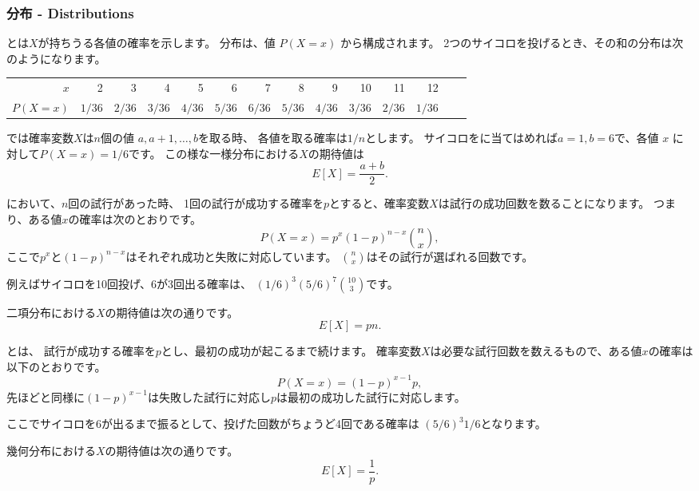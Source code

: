 \subsubsection{分布 - Distributions}


とは$X$が持ちうる各値の確率を示します。
分布は、値 $P(X=x)$ から構成されます。
2つのサイコロを投げるとき、その和の分布は次のようになります。

\begin{center}
\small {
\begin{tabular}{r|rrrrrrrrrrrrr}
$x$ & 2 & 3 & 4 & 5 & 6 & 7 & 8 & 9 & 10 & 11 & 12 \\
$P(X=x)$ & $1/36$ & $2/36$ & $3/36$ & $4/36$ & $5/36$ & $6/36$ & $5/36$ & $4/36$ & $3/36$ & $2/36$ & $1/36$ \\
\end{tabular}
}
\end{center}

では確率変数$X$は$n$個の値 $a,a+1,\ldots,b$を取る時、
各値を取る確率は$1/n$とします。
サイコロをに当てはめれば$a = 1, b = 6$で、各値 $x$ に対して$P(X = x) = 1/6$です。
この様な一様分布における$X$の期待値は
\[E[X] = \frac{a+b}{2}.\]

において、$n$回の試行があった時、
1回の試行が成功する確率を$p$とすると、確率変数$X$は試行の成功回数を数ることになります。
つまり、ある値$x$の確率は次のとおりです。
\[P(X=x)=p^x (1-p)^{n-x} {n \choose x},\]
ここで$p^x$と$(1-p)^{n-x}$はそれぞれ成功と失敗に対応しています。
${n \choose x}$はその試行が選ばれる回数です。

例えばサイコロを10回投げ、6が3回出る確率は、
$(1/6)^3 (5/6)^7 {10 \choose 3}$です。

二項分布における$X$の期待値は次の通りです。
\[E[X] = pn.\]

とは、
試行が成功する確率を$p$とし、最初の成功が起こるまで続けます。
確率変数$X$は必要な試行回数を数えるもので、ある値$x$の確率は以下のとおりです。
\[P(X=x)=(1-p)^{x-1} p,\]
先ほどと同様に$(1-p)^{x-1}$は失敗した試行に対応し$p$は最初の成功した試行に対応します。

ここでサイコロを6が出るまで振るとして、投げた回数がちょうど4回である確率は
$(5/6)^3 1/6$となります。

幾何分布における$X$の期待値は次の通りです。
\[E[X]=\frac{1}{p}.\]

